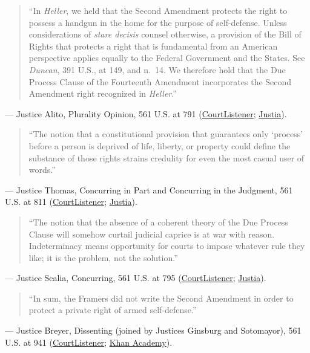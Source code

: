 \documentclass[12pt]{article}
\begin{document}
\begin{quote}
``In \textit{Heller}, we held that the Second Amendment protects the right to possess a handgun in the home for the purpose of self-defense. Unless considerations of \textit{stare decisis} counsel otherwise, a provision of the Bill of Rights that protects a right that is fundamental from an American perspective applies equally to the Federal Government and the States. See \textit{Duncan}, 391 U.S., at 149, and n.~14. We therefore hold that the Due Process Clause of the Fourteenth Amendment incorporates the Second Amendment right recognized in \textit{Heller}.''
\end{quote}
\noindent --- Justice Alito, Plurality Opinion, 561 U.S. at 791 (\href{https://www.courtlistener.com/opinion/149702/mcdonald-v-city-of-chicago/}{CourtListener}; \href{https://supreme.justia.com/cases/federal/us/561/742/}{Justia}).

\begin{quote}
``The notion that a constitutional provision that guarantees only `process' before a person is deprived of life, liberty, or property could define the substance of those rights strains credulity for even the most casual user of words.''
\end{quote}
\noindent --- Justice Thomas, Concurring in Part and Concurring in the Judgment, 561 U.S. at 811 (\href{https://www.courtlistener.com/opinion/149702/mcdonald-v-city-of-chicago/}{CourtListener}; \href{https://supreme.justia.com/cases/federal/us/561/742/}{Justia}).

\begin{quote}
``The notion that the absence of a coherent theory of the Due Process Clause will somehow curtail judicial caprice is at war with reason. Indeterminacy means opportunity for courts to impose whatever rule they like; it is the problem, not the solution.''
\end{quote}
\noindent --- Justice Scalia, Concurring, 561 U.S. at 795 (\href{https://www.courtlistener.com/opinion/149702/mcdonald-v-city-of-chicago/}{CourtListener}; \href{https://supreme.justia.com/cases/federal/us/561/742/}{Justia}).

\begin{quote}
``In sum, the Framers did not write the Second Amendment in order to protect a private right of armed self-defense.''
\end{quote}
\noindent --- Justice Breyer, Dissenting (joined by Justices Ginsburg and Sotomayor), 561 U.S. at 941 (\href{https://www.courtlistener.com/opinion/149702/mcdonald-v-city-of-chicago/}{CourtListener}; \href{https://www.khanacademy.org/humanities/constitution-101/x7a03a96a83aa80ff:the-bill-of-rights/x7a03a96a83aa80ff:second-amendment-modern-cases-and-debates/a/primary-source-mcdonald-v-city-of-chicago-2012}{Khan Academy}).
\end{document}
